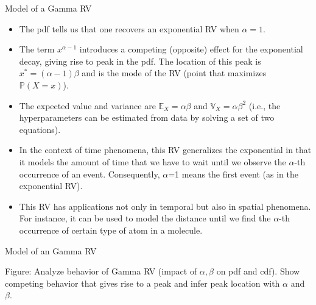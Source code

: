 \documentclass[9pt]{beamer}
\begin{document}
%
\begin{frame}{Model of a Gamma RV}

\begin{itemize}
\item The pdf tells us that one recovers an exponential RV when $\alpha=1$. 
\item The term $x^{\alpha-1}$ introduces a competing (opposite) effect for the exponential decay, giving rise to peak in the pdf. The location of this peak is $x^*=(\alpha-1)\beta$ and is the mode of the RV (point that maximizes $\mathbb{P}(X=x)$). 
\item The expected value and variance are $\mathbb{E}_X=\alpha\beta$ and $\mathbb{V}_X=\alpha\beta^2$ (i.e., the hyperparameters can be estimated from data by solving a set of two equations). 
\item In the context of time phenomena, this RV generalizes the exponential in that it models the amount of time that we have to wait until we observe the $\alpha$-th occurrence of an event. Consequently, $\alpha$=1 means the first event (as in the exponential RV). 
\item This RV has applications not only in temporal but also in spatial phenomena. For instance, it can be used to model the distance until we find the $\alpha$-th occurrence of certain type of atom in a molecule.  
\end{itemize}

\end{frame}


%
\begin{frame}{Model of an Gamma RV}
\begin{block}{}
{\color{red} Figure: Analyze behavior of Gamma RV (impact of $\alpha,\beta$ on pdf and cdf). Show competing behavior that gives rise to a peak and infer peak location with $\alpha$ and $\beta$.}
\end{block}

\end{frame}
\end{document}
